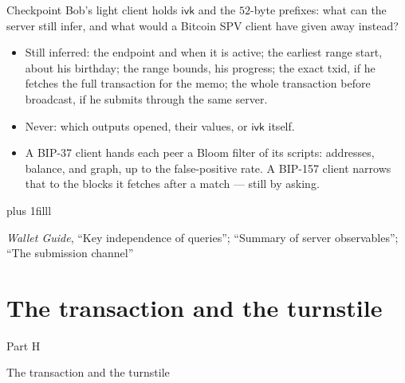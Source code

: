 \documentclass[aspectratio=169,11pt]{beamer}
\newcommand{\ivk}{\ensuremath{\mathsf{ivk}}}
\newcommand{\divider}[2]{%
  \section{#2}
  \begin{frame}[plain,t]
  \vspace*{14mm}
  {\small\color{arb}#1\par}
  \vskip8mm
  \begin{minipage}{0.88\textwidth}\raggedright
    \fontsize{27}{31}\selectfont #2\par
  \end{minipage}
  \end{frame}}
\newcommand{\src}[1]{\par\vskip0pt plus 1filll
  {\fontsize{6}{7.2}\selectfont\color{arbdim}\raggedright #1\par}}
\begin{document}
\begin{frame}{Checkpoint}
\Large
Bob's light client holds \ivk{} and the $52$-byte prefixes: what can the
server still infer, and what would a Bitcoin SPV client have given away
instead?
\pause
\normalsize
\bigskip
\begin{itemize}
  \item Still inferred: the endpoint and when it is active; the earliest
    range start, about his birthday; the range bounds, his progress; the
    exact txid, if he fetches the full transaction for the memo; the
    whole transaction before broadcast, if he submits through the same
    server.
  \item Never: which outputs opened, their values, or \ivk{} itself.
  \item A BIP-37 client hands each peer a Bloom filter of its scripts:
    addresses, balance, and graph, up to the false-positive rate. A
    BIP-157 client narrows that to the blocks it fetches after a match
    --- still by asking.
\end{itemize}
\src{\emph{Wallet Guide}, ``Key independence of queries''; ``Summary of server
  observables''; ``The submission channel''}
\end{frame}

\newcommand{\Hvb}{\ensuremath{v_{\mathrm{balance}}}}
\newcommand{\Hvbi}{\ensuremath{v_{\mathrm{balance}}^{\mathsf{Ironwood}}}}
\newcommand{\Hvbo}{\ensuremath{v_{\mathrm{balance}}^{\mathsf{Orchard}}}}
\newcommand{\Hd}[1]{\ensuremath{d_{\mathrm{#1}}}}

\divider{Part H}{The transaction and the turnstile}
\end{document}
